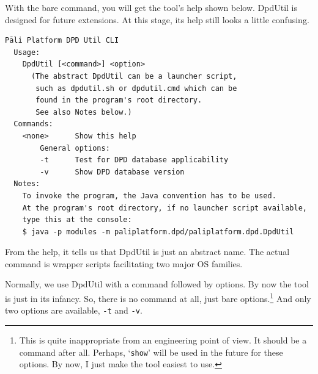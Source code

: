 With the bare command, you will get the tool's help shown below. DpdUtil is designed for future extensions. At this stage, its help still looks a little confusing.

{\footnotesize
\begin{verbatim}
Pāli Platform DPD Util CLI
  Usage:
    DpdUtil [<command>] <option>
      (The abstract DpdUtil can be a launcher script,
       such as dpdutil.sh or dpdutil.cmd which can be
       found in the program's root directory.
       See also Notes below.)
  Commands:
    <none>      Show this help
        General options:
        -t      Test for DPD database applicability
        -v      Show DPD database version
  Notes:
    To invoke the program, the Java convention has to be used.
    At the program's root directory, if no launcher script available,
    type this at the console: 
    $ java -p modules -m paliplatform.dpd/paliplatform.dpd.DpdUtil
\end{verbatim}
}

From the help, it tells us that DpdUtil is just an abstract name. The actual command is wrapper scripts facilitating two major OS families.

Normally, we use DpdUtil with a command followed by options. By now the tool is just in its infancy. So, there is no command at all, just bare options.\footnote{This is quite inappropriate from an engineering point of view. It should be a command after all. Perhaps, `\texttt{show}' will be used in the future for these options. By now, I just make the tool easiest to use.} And only two options are available, \texttt{-t} and \texttt{-v}.


